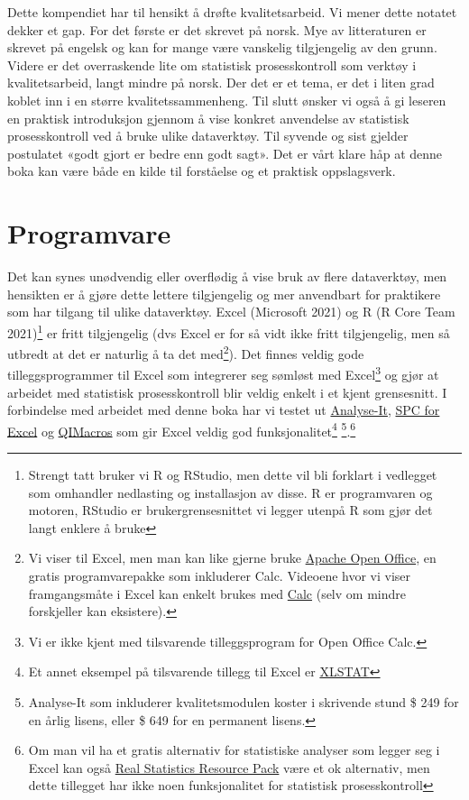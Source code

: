 \documentclass[
]{book}
\begin{document}
Dette kompendiet har til hensikt å drøfte kvalitetsarbeid. Vi mener dette notatet dekker et gap. For det første er det skrevet på norsk. Mye av litteraturen er skrevet på engelsk og kan for mange være vanskelig tilgjengelig av den grunn. Videre er det overraskende lite om statistisk prosesskontroll som verktøy i kvalitetsarbeid, langt mindre på norsk. Der det er et tema, er det i liten grad koblet inn i en større kvalitetssammenheng. Til slutt ønsker vi også å gi leseren en praktisk introduksjon gjennom å vise konkret anvendelse av statistisk prosesskontroll ved å bruke ulike dataverktøy. Til syvende og sist gjelder postulatet «godt gjort er bedre enn godt sagt». Det er vårt klare håp at denne boka kan være både en kilde til forståelse og et praktisk oppslagsverk.

\hypertarget{programvare}{%
\section{Programvare}\label{programvare}}

Det kan synes unødvendig eller overflødig å vise bruk av flere dataverktøy, men hensikten er å gjøre dette lettere tilgjengelig og mer anvendbart for praktikere som har tilgang til ulike dataverktøy. Excel (Microsoft 2021) og R (R Core Team 2021)\footnote{Strengt tatt bruker vi R og RStudio, men dette vil bli forklart i vedlegget som omhandler nedlasting og installasjon av disse. R er programvaren og motoren, RStudio er brukergrensesnittet vi legger utenpå R som gjør det langt enklere å bruke} er fritt tilgjengelig (dvs Excel er for så vidt ikke fritt tilgjengelig, men så utbredt at det er naturlig å ta det med\footnote{Vi viser til Excel, men man kan like gjerne bruke \href{https://www.openoffice.org/no/}{Apache Open Office}, en gratis programvarepakke som inkluderer Calc. Videoene hvor vi viser framgangsmåte i Excel kan enkelt brukes med \href{https://www.openoffice.org/no/product/calc.html}{Calc} (selv om mindre forskjeller kan eksistere).}). Det finnes veldig gode tilleggsprogrammer til Excel som integrerer seg sømløst med Excel\footnote{Vi er ikke kjent med tilsvarende tilleggsprogram for Open Office Calc.} og gjør at arbeidet med statistisk prosesskontroll blir veldig enkelt i et kjent grensesnitt. I forbindelse med arbeidet med denne boka har vi testet ut \href{https://analyse-it.com/}{Analyse-It}, \href{https://www.spcforexcel.com/}{SPC for Excel} og \href{https://www.qimacros.com/}{QIMacros} som gir Excel veldig god funksjonalitet\footnote{Et annet eksempel på tilsvarende tillegg til Excel er \href{https://www.xlstat.com/en/}{XLSTAT}} \footnote{Analyse-It som inkluderer kvalitetsmodulen koster i skrivende stund \$ 249 for en årlig lisens, eller \$ 649 for en permanent lisens.}.\footnote{Om man vil ha et gratis alternativ for statistiske analyser som legger seg i Excel kan også \href{https://www.real-statistics.com/}{Real Statistics Resource Pack} være et ok alternativ, men dette tillegget har ikke noen funksjonalitet for statistisk prosesskontroll}
\end{document}

